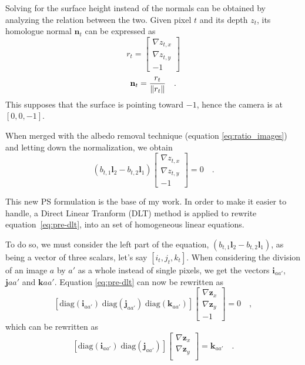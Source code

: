 \documentclass{report}
\begin{document}
Solving for the surface height instead of the normals can be obtained by analyzing the relation between the two. Given pixel $t$ and its depth $z_t$, its homologue normal $\mathbf{n}_t$ can be expressed as
\begin{equation}
r_t = 
\begin{bmatrix}
\nabla z_{t,x} \\
\nabla z_{t,y} \\
-1
\end{bmatrix}
\end{equation}
\begin{equation}
\mathbf{n}_t =
\frac{r_t}{\left\lVert r_t\right\rVert} \quad.
\end{equation}
This supposes that the surface is pointing toward $-1$, hence the camera is at $[0, 0, -1]$.

When merged with the albedo removal technique (equation \eqref{eq:ratio_images}) and letting down the normalization, we obtain
\begin{equation}
\label{eq:pre-dlt}
\left( b_{t,1} \mathbf{l}_2 - b_{t,2} \mathbf{l}_1 \right)
\begin{bmatrix}
\nabla z_{t,x} \\
\nabla z_{t,y} \\
-1
\end{bmatrix}
= 0  \quad.
\end{equation}

This new PS formulation is the base of my work. In order to make it easier to handle, a Direct Linear Tranform (DLT) method is applied to rewrite equation~\eqref{eq:pre-dlt}, into an set of homogeneous linear equations.

To do so, we must consider the left part of the equation, $\left( b_{t,1} \mathbf{l}_2 - b_{t,2} \mathbf{l}_1 \right)$, as being a vector of three scalars, let's say $\left[ i_t, j_t, k_t \right]$. When considering the division of an image $a$ by $a'$ as a whole instead of single pixels, we get the vectors $\mathbf{i}_{aa'}$, $\mathbf{j}{aa'}$ and $\mathbf{k}{aa'}$. Equation \eqref{eq:pre-dlt} can now be rewritten as
\begin{equation}
\left[ \mathrm{diag}(\mathbf{i}_{aa'}) \; \mathrm{diag}(\mathbf{j}_{aa'}) \; \mathrm{diag}(\mathbf{k}_{aa'})\right]
\begin{bmatrix}
\nabla \mathbf{z}_{x} \\
\nabla \mathbf{z}_{y} \\
-1
\end{bmatrix}
= 0 \quad,
\end{equation}
which can be rewritten as
\begin{equation}
\left[ \mathrm{diag}(\mathbf{i}_{aa'}) \; \mathrm{diag}(\mathbf{j}_{aa'}) \right]
\begin{bmatrix}
\nabla \mathbf{z}_{x} \\
\nabla \mathbf{z}_{y} \\
\end{bmatrix}
= \mathbf{k}_{aa'} \quad.
\end{equation}
\end{document}
